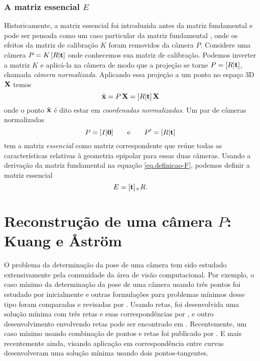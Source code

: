 \subsubsection*{A matriz essencial $E$}
Historicamente, a matriz essencial foi introduzida antes da matriz fundamental e pode ser pensada como um caso particular da matriz fundamental \citep{Longuet}, onde os efeitos da matriz de calibração $K$ foram removidos da câmera $P$. Considere uma câmera $P=K\,[R|{\bf t}]$ onde conhecemos sua matriz de calibração. Podemos inverter a matriz $K$ e aplicá-la na câmera de modo que a projeção se torne $P=[R|{\bf t}]$, chamada {\it câmera normalizada}. Aplicando essa projeção a um ponto no espaço 3D $\mathbf{X}$ temos 
\begin{equation*}
\hat{\mathbf{x}}=P\,\mathbf{X}=[R|{\bf t}]\,\mathbf{X}
\end{equation*}
onde o ponto $\hat{\mathbf{x}}$ é dito estar em {\it coordenadas  normalizadas}. Um par de câmeras normalizadas 
\begin{equation*}
P=[I|{\bf 0}]\qquad\text{e}\qquad P'=[R|{\bf t}]
\end{equation*}
tem a matriz {\it essencial} como matriz correspondente que reúne todas as características relativas à geometria epipolar para essas duas câmeras. Usando a derivação da matriz fundamental na equação \ref{eq.definicao-F}, podemos definir a matriz essencial
\begin{equation*}
E=[{\bf t}]_\times R.
\end{equation*}

\newpage
\section{Reconstrução de uma câmera $P$: Kuang e {\AA}str{\"o}m}\label{sec.astrom}

O problema da determinação da pose de uma câmera tem sido estudado extensivamente pela comunidade da área de visão computacional. Por exemplo, o caso mínimo da determinação da pose de uma câmera usando três pontos foi estudado por inicialmente \citep{fischler} e outras formulações para problemas mínimos desse tipo foram comparadas e revisadas por \citep{haralick}. Usando retas, foi desenvolvida uma solução mínima com três retas e suas correspondências por \citep{chen}, e outro desenvolvimento envolvendo retas pode ser encontrado em \citep{dhome}. Recentemente, um caso mínimo usando combinação de pontos e retas foi publicado por \citep{ramalingam}. E mais recentemente ainda, visando aplicação em correspondência entre curvas \citep{Fabbri:Giblin:Kimia:ECCV12} desenvolveram uma solução mínima usando dois pontos-tangentes.

